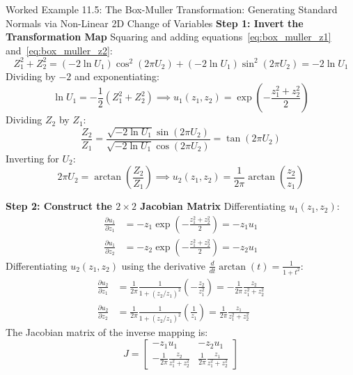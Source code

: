 \begin{examplebox}[breakable]{Worked Example 11.5: The Box-Muller Transformation: Generating Standard Normals via Non-Linear 2D Change of Variables}
\textbf{Step 1: Invert the Transformation Map}
Squaring and adding equations~\eqref{eq:box_muller_z1} and~\eqref{eq:box_muller_z2}:
\begin{equation}
Z_1^2 + Z_2^2 = (-2\ln U_1)\cos^2(2\pi U_2) + (-2\ln U_1)\sin^2(2\pi U_2) = -2\ln U_1
\end{equation}
Dividing by $-2$ and exponentiating:
\begin{equation}
\ln U_1 = -\frac{1}{2}(Z_1^2 + Z_2^2) \implies u_1(z_1, z_2) = \exp\left( -\frac{z_1^2 + z_2^2}{2} \right)
\label{eq:u1_inv}
\end{equation}
Dividing $Z_2$ by $Z_1$:
\begin{equation}
\frac{Z_2}{Z_1} = \frac{\sqrt{-2\ln U_1}\sin(2\pi U_2)}{\sqrt{-2\ln U_1}\cos(2\pi U_2)} = \tan(2\pi U_2)
\end{equation}
Inverting for $U_2$:
\begin{equation}
2\pi U_2 = \arctan\left(\frac{Z_2}{Z_1}\right) \implies u_2(z_1, z_2) = \frac{1}{2\pi}\arctan\left(\frac{z_2}{z_1}\right)
\label{eq:u2_inv}
\end{equation}

\textbf{Step 2: Construct the $2 \times 2$ Jacobian Matrix}
Differentiating $u_1(z_1, z_2)$:
\begin{align}
\frac{\partial u_1}{\partial z_1} &= -z_1 \exp\left(-\frac{z_1^2 + z_2^2}{2}\right) = -z_1 u_1 \\
\frac{\partial u_1}{\partial z_2} &= -z_2 \exp\left(-\frac{z_1^2 + z_2^2}{2}\right) = -z_2 u_1
\end{align}
Differentiating $u_2(z_1, z_2)$ using the derivative $\frac{d}{dt}\arctan(t) = \frac{1}{1+t^2}$:
\begin{align}
\frac{\partial u_2}{\partial z_1} &= \frac{1}{2\pi} \frac{1}{1 + (z_2/z_1)^2} \left(-\frac{z_2}{z_1^2}\right) = -\frac{1}{2\pi}\frac{z_2}{z_1^2 + z_2^2} \\
\frac{\partial u_2}{\partial z_2} &= \frac{1}{2\pi} \frac{1}{1 + (z_2/z_1)^2} \left(\frac{1}{z_1}\right) = \frac{1}{2\pi}\frac{z_1}{z_1^2 + z_2^2}
\end{align}
The Jacobian matrix of the inverse mapping is:
\begin{equation}
J = \begin{bmatrix} -z_1 u_1 & -z_2 u_1 \\ -\frac{1}{2\pi}\frac{z_2}{z_1^2 + z_2^2} & \frac{1}{2\pi}\frac{z_1}{z_1^2 + z_2^2} \end{bmatrix}
\end{equation}


\end{examplebox}
